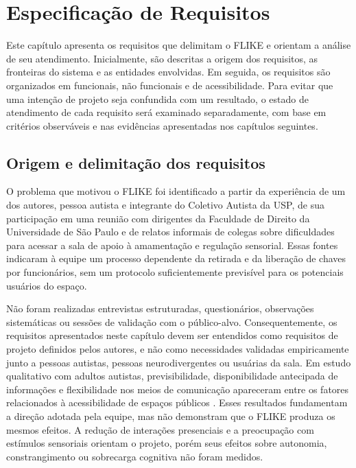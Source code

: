 \chapter{Especificação de Requisitos} \label{cap:especificacao}

Este capítulo apresenta os requisitos que delimitam o FLIKE e orientam a análise de seu atendimento. Inicialmente, são descritas a origem dos requisitos, as fronteiras do sistema e as entidades envolvidas. Em seguida, os requisitos são organizados em funcionais, não funcionais e de acessibilidade. Para evitar que uma intenção de projeto seja confundida com um resultado, o estado de atendimento de cada requisito será examinado separadamente, com base em critérios observáveis e nas evidências apresentadas nos capítulos seguintes.

\section{Origem e delimitação dos requisitos}

O problema que motivou o FLIKE foi identificado a partir da experiência de um dos autores, pessoa autista e integrante do Coletivo Autista da USP, de sua participação em uma reunião com dirigentes da Faculdade de Direito da Universidade de São Paulo e de relatos informais de colegas sobre dificuldades para acessar a sala de apoio à amamentação e regulação sensorial. Essas fontes indicaram à equipe um processo dependente da retirada e da liberação de chaves por funcionários, sem um protocolo suficientemente previsível para os potenciais usuários do espaço.

Não foram realizadas entrevistas estruturadas, questionários, observações sistemáticas ou sessões de validação com o público-alvo. Consequentemente, os requisitos apresentados neste capítulo devem ser entendidos como requisitos de projeto definidos pelos autores, e não como necessidades validadas empiricamente junto a pessoas autistas, pessoas neurodivergentes ou usuárias da sala. Em estudo qualitativo com adultos autistas, previsibilidade, disponibilidade antecipada de informações e flexibilidade nos meios de comunicação apareceram entre os fatores relacionados à acessibilidade de espaços públicos \cite{maclennan2023sensory}. Esses resultados fundamentam a direção adotada pela equipe, mas não demonstram que o FLIKE produza os mesmos efeitos. A redução de interações presenciais e a preocupação com estímulos sensoriais orientam o projeto, porém seus efeitos sobre autonomia, constrangimento ou sobrecarga cognitiva não foram medidos.

